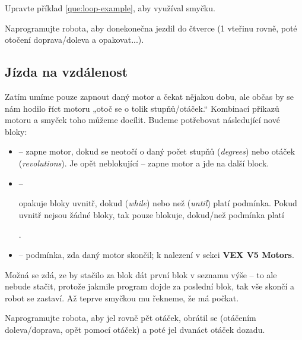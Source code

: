 \documentclass[../main.tex]{subfiles}
\begin{document}
	\begin{question}
		Upravte příklad \ref{que:loop-example}, aby využíval smyčku.
	\end{question}

	\begin{question}
		Naprogramujte robota, aby donekonečna jezdil do čtverce (1 vteřinu rovně, poté otočení doprava/doleva a opakovat...).
	\end{question}

	\subsection{Jízda na vzdálenost}
	Zatím umíme pouze zapnout daný motor a čekat nějakou dobu, ale občas by se nám hodilo říct motoru „otoč se o tolik stupňů/otáček.“ Kombinací příkazů motoru a smyček toho můžeme docílit. Budeme potřebovat následující nové bloky:
	\begin{itemize}
		\item[\block]  -- zapne motor, dokud se neotočí o daný počet stupňů (\textit{degrees}) nebo otáček (\textit{revolutions}). Je opět neblokující -- zapne motor a jde na další block.
		\item[\block]  -- \parbox{0.725\textwidth}{opakuje bloky uvnitř, dokud (\textit{while}) nebo než (\textit{until}) platí podmínka. Pokud uvnitř nejsou žádné bloky, tak pouze blokuje, dokud/než podmínka platí}.
		\item[\block]  -- podmínka, zda daný motor skončil; k nalezení v sekci \textbf{VEX V5 Motors}.
	\end{itemize}

	Možná se zdá, ze by stačilo za  blok dát první blok v seznamu výše -- to ale nebude stačit, protože jakmile program dojde za poslední blok, tak vše skončí a robot se zastaví. Až teprve smyčkou mu řekneme, že má počkat.

	\begin{question}
		Naprogramujte robota, aby jel rovně pět otáček, obrátil se (otáčením doleva/doprava, opět pomocí otáček) a poté jel dvanáct otáček dozadu.
	\end{question}
\end{document}
